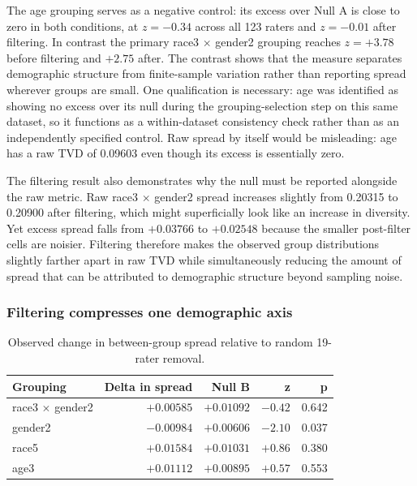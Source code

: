 \documentclass[11pt,a4paper]{article}
\begin{document}
The age grouping serves as a negative control: its excess over Null A is close to zero in both
conditions, at $z = -0.34$ across all 123 raters and $z = -0.01$ after filtering. In contrast the
primary race3 $\times$ gender2 grouping reaches $z = +3.78$ before filtering and $+2.75$ after. The
contrast shows that the measure separates demographic structure from finite-sample variation
rather than reporting spread wherever groups are small. One qualification is necessary: age was
identified as showing no excess over its null during the grouping-selection step on this same
dataset, so it functions as a within-dataset consistency check rather than as an independently
specified control. Raw spread by itself
would be misleading: age has a raw TVD of 0.09603 even though its excess is essentially zero.

The filtering result also demonstrates why the null must be reported alongside the raw metric.
Raw race3 $\times$ gender2 spread increases slightly from 0.20315 to 0.20900 after filtering,
which might superficially look like an increase in diversity. Yet excess spread falls from
$+0.03766$ to $+0.02548$ because the smaller post-filter cells are noisier. Filtering therefore
makes the observed group distributions slightly farther apart in raw TVD while simultaneously
reducing the amount of spread that can be attributed to demographic structure beyond sampling
noise.

\subsubsection{Filtering compresses one demographic axis}
\label{sec:compress}

\begin{table}[htbp]
\centering
\caption{Observed change in between-group spread relative to random 19-rater removal.}
\label{tab:nullb-rq3}
\small\begin{tabular}{lrrrr}
\toprule
\textbf{Grouping} & \textbf{Delta in spread} & \textbf{Null B} & \textbf{z} & \textbf{p} \\
\midrule
race3 $\times$ gender2 & $+0.00585$ & $+0.01092$ & $-0.42$ & 0.642 \\
gender2 & $-0.00984$ & $+0.00606$ & $-2.10$ & 0.037 \\
race5 & $+0.01584$ & $+0.01031$ & $+0.86$ & 0.380 \\
age3 & $+0.01112$ & $+0.00895$ & $+0.57$ & 0.553 \\
\bottomrule
\end{tabular}
\end{table}
\end{document}
